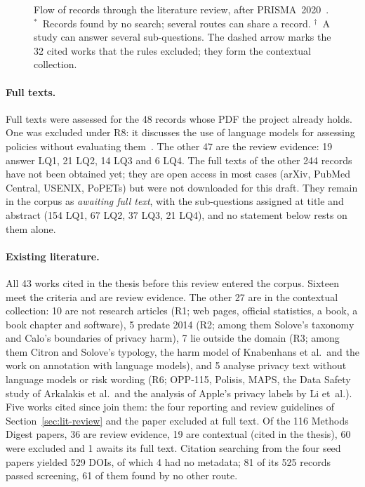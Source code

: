\begin{figure}[tbp]
\centering
\resizebox{\textwidth}{!}{}
\caption[Flow of records through the literature review]{Flow of records
through the literature review, after PRISMA~2020~\parencite{page2021prisma}.
$^{*}$~Records found by no search; several routes can share a record.
$^{\dagger}$~A study can answer several sub-questions. The dashed arrow marks
the 32 cited works that the rules excluded; they form the contextual
collection.}
\label{fig:lit-flow}
\end{figure}

\paragraph{Full texts.} Full texts were assessed for the 48 records whose PDF
the project already holds. One was excluded under R8: it discusses the use of
language models for assessing policies without evaluating
them~\parencite{aydin2024assessing}. The other 47 are the review
evidence: 19 answer LQ1, 21 LQ2, 14 LQ3 and 6 LQ4. The full texts of the other
244 records have not been obtained yet; they are open access in most cases
(arXiv, PubMed Central, USENIX, PoPETs) but were not downloaded for this draft.
They remain in the corpus as \emph{awaiting full text}, with the sub-questions
assigned at title and abstract (154 LQ1, 67 LQ2, 37 LQ3, 21 LQ4), and no
statement below rests on them alone.

\paragraph{Existing literature.} All 43 works cited in the thesis before this
review entered the corpus. Sixteen meet the criteria and are review evidence.
The other 27 are in the contextual collection: 10 are not research articles
(R1; web pages, official statistics, a book, a book chapter and software), 5
predate 2014 (R2; among them Solove's taxonomy and Calo's boundaries of privacy
harm), 7 lie outside the domain (R3; among them Citron and Solove's typology,
the harm model of Knabenhans et al.\ and the work on annotation with language
models), and 5 analyse privacy text without language models or risk wording
(R6; OPP-115, Polisis, MAPS, the Data Safety study of Arkalakis et al.\ and the
analysis of Apple's privacy labels by Li et~al.). Five works cited since join
them: the four reporting and review guidelines of
Section~\ref{sec:lit-review} and the paper excluded at full text. Of the 116 Methods Digest
papers, 36 are review evidence, 19 are contextual (cited in the thesis), 60
were excluded and 1 awaits its full text. Citation searching from the four seed
papers yielded 529 DOIs, of which 4 had no metadata; 81 of its 525 records
passed screening, 61 of them found by no other route.

